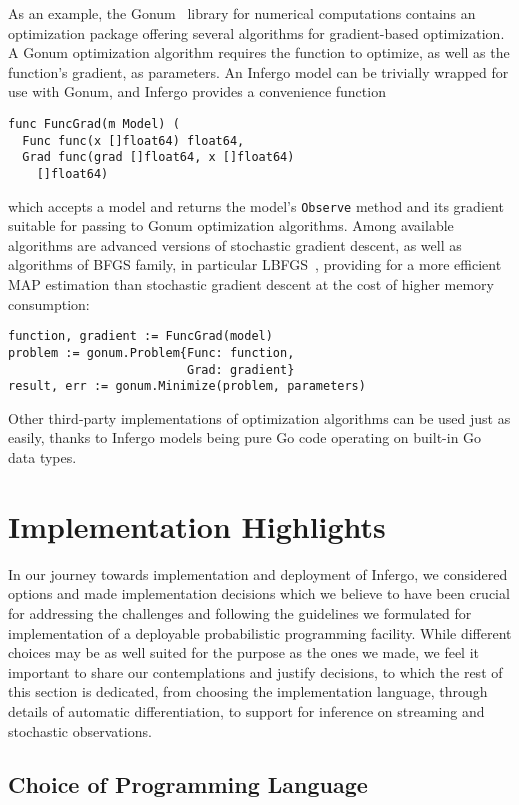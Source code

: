 \documentclass[sigplan,review,10pt,anonymous]{acmart}
\begin{document}
\begin{sloppypar}
As an example, the Gonum~\cite{Gonum} library for numerical
computations contains an optimization package offering several
algorithms for gradient-based optimization. A Gonum optimization
algorithm requires the function to optimize, as well as the
function's gradient, as parameters. An Infergo model can be
trivially wrapped for use with Gonum, and Infergo provides a
convenience function
\begin{lstlisting}
func FuncGrad(m Model) (
  Func func(x []float64) float64,
  Grad func(grad []float64, x []float64)
    []float64)
\end{lstlisting}
which accepts a model and returns the model's
\lstinline{Observe} method and its gradient suitable for passing
to Gonum optimization algorithms. Among available algorithms are
advanced versions of stochastic gradient descent, as well as
algorithms of BFGS family, in particular LBFGS~\cite{LN89},
providing for a more efficient MAP estimation than stochastic
gradient descent at the cost of higher memory consumption:
\begin{lstlisting}
function, gradient := FuncGrad(model)
problem := gonum.Problem{Func: function, 
                         Grad: gradient}
result, err := gonum.Minimize(problem, parameters)
\end{lstlisting}

Other third-party implementations of optimization algorithms can
be used just as easily, thanks to Infergo models being pure Go
code operating on built-in Go data types.

\section{Implementation Highlights}

In our journey towards implementation and deployment of Infergo, we
considered options and made implementation decisions which we
believe to have been crucial for addressing the challenges and
following the guidelines we formulated for implementation of a
deployable probabilistic programming facility. While different
choices may be as well suited for the purpose as the ones we
made, we feel it important to share our contemplations and
justify decisions, to which the rest of this section is
dedicated, from choosing the implementation language, through
details of automatic differentiation, to support for inference
on streaming and stochastic observations.

\subsection{Choice of Programming Language}


\end{sloppypar}
\end{document}

